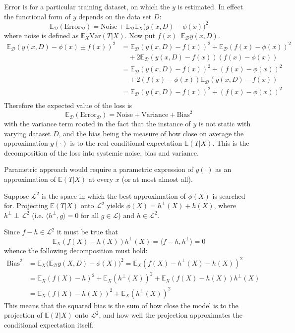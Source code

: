 \documentclass[a4paper]{article}
\newcommand{\Dcal}{\mathcal{D}}
\newcommand{\Lcal}{\mathcal{L}}
\newcommand{\ex}{\mathbb{E}}
\newcommand{\Var}[0]{{\text{Var}}}
\newcommand{\defn}{\mathop{\overset{\Delta}{=}}\nolimits}
\begin{document}
Error is for a particular training dataset, on which the $y$ is estimated. In effect
the functional form of $y$ depends on the data set $D$:
\[\ex_\Dcal(\text{Error}_\Dcal) = \text{Noise} + \ex_\Dcal \ex_X \bigl( y(x,D)-\phi(x) \bigr)^2\]
where noise is defined as $\ex_X \Var(T\rvert X)$.
Now put $f(x) \defn \ex_\Dcal y(x,D)$.
\begin{align*}
	\ex_\Dcal( y(x,D)-\phi(x) \pm f(x) )^2
		& = \ex_\Dcal( y(x,D) - f(x) )^2 + \ex_\Dcal( f(x) - \phi(x) )^2 \\
			&\quad + 2 \ex_\Dcal( y(x,D) - f(x) )( f(x) - \phi(x) ) \\
		& = \ex_\Dcal( y(x,D) - f(x) )^2 + ( f(x) - \phi(x) )^2 \\
			&\quad + 2( f(x) - \phi(x) ) \ex_\Dcal( y(x,D) - f(x) ) \\
		& = \ex_\Dcal( y(x,D) - f(x) )^2 + ( f(x) - \phi(x) )^2 \\
\end{align*}
Therefore the expected value of the loss is 
\[\ex_\Dcal(\text{Error}_\Dcal) = \text{Noise} + \text{Variance} + \text{Bias}^2\]
with the variance term rooted in the fact that the instance of $y$ is not static
with varying dataset $D$, and the bias being the measure of how close on average
the approximation $y(\cdot)$ is to the real conditional expectation $\ex(T\rvert X)$.
This is the decomposition of the loss into systemic noise, bias and variance.


Parametric approach would require a parametric expression of $y(\cdot)$ as an
approximation of $\ex(T\rvert X)$ at every $x$ (or at most almost all).

Suppose $\Lcal^2$ is the space in which the best approximation of $\phi(X)$ is
searched for. Projecting $\ex(T\rvert X)$ onto $\Lcal^2$ yields $\phi(X) = h^\perp(X) + h(X)$,
where $h^\perp \perp \Lcal^2$ (i.e. $\langle h^\perp,g\rangle = 0$ for all
$g\in \Lcal$) and $h\in \Lcal^2$.



Since $f-h\in\Lcal^2$ it must be true that
\[\ex_X (f(X) - h(X)) h^\perp(X) = \langle f-h, h^\perp\rangle = 0 \]
whence the following decomposition must hold:
\begin{align*}
	\text{Bias}^2 &= \ex_X \bigl( \ex_\Dcal y(X,D) - \phi(X) \bigr)^2 
		= \ex_X (f(X) - h^\perp(X) - h(X))^2 \\
		& = \ex_X (f(X) - h)^2 + \ex_X (h^\perp(X))^2 + \ex_X (f(X) - h(X)) h^\perp(X) \\
		& = \ex_X (f(X) - h(X))^2 + \ex_X (h^\perp(X))^2
\end{align*}
This means that the squared bias is the sum of how close the model is to the projection
of $\ex(T\rvert X)$ onto $\Lcal^2$, and how well the projection approximates the
conditional expectation itself.
\end{document}
